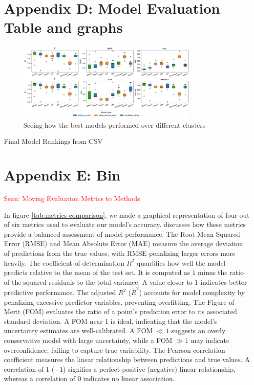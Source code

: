 \documentclass[11pt]{article}
\newcommand{\Sean}[1]{{\textcolor{red}{{Sean: #1}} }}
\begin{document}
\section{Appendix D: Model Evaluation Table and graphs}
\label{appendix:D}

\begin{figure}[H]
    \centering
    \includegraphics[width=0.8\textwidth]{LatexPlots/CV_plots/boxplots.png}
    \caption{Seeing how the best models performed over different clusters}
    \label{fig:boxplots}
\end{figure}

\begin{table}[H]
    \centering
    \caption{Final Model Rankings from CSV}
    {\fontsize{7}{9.5}\selectfont
    }
    \label{tab:rankingtable}
\end{table}
    

\section{Appendix E: Bin}
\label{appendix:bin}
\Sean{Moving Evaluation Metrics to Methods}

In figure \ref{tab:metrics-comparison}, we made a graphical representation of four out of six metrics used to evaluate our model’s accuracy. \cite{bible} discusses how these metrics provide a balanced assessment of model performance.
The Root Mean Squared Error (RMSE) and Mean Absolute Error (MAE) measure the average deviation of predictions from the true values, with RMSE penalizing larger errors more heavily.
The coefficient of determination \( R^2 \) quantifies how well the model predicts relative to the mean of the test set. It is computed as \( 1 \) minus the ratio of the squared residuals to the total variance. A value closer to \( 1 \) indicates better predictive performance.
The adjusted \( R^2 \) (\(\bar{R}^2\)) accounts for model complexity by penalizing excessive predictor variables, preventing overfitting.
The Figure of Merit (FOM) evaluates the ratio of a point’s prediction error to its associated standard deviation. A FOM near \( 1 \) is ideal, indicating that the model’s uncertainty estimates are well-calibrated. A FOM \( \ll 1 \) suggests an overly conservative model with large uncertainty, while a FOM \( \gg 1 \) may indicate overconfidence, failing to capture true variability.
The Pearson correlation coefficient measures the linear relationship between predictions and true values. A correlation of \( 1 \) (\(-1\)) signifies a perfect positive (negative) linear relationship, whereas a correlation of \( 0 \) indicates no linear association.
\end{document}
